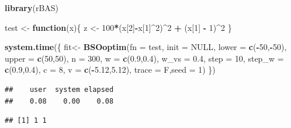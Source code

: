 \documentclass[]{ctexbook}
\newenvironment{Shaded}{\begin{snugshade}}{\end{snugshade}}
\newcommand{\KeywordTok}[1]{\textcolor[rgb]{0.13,0.29,0.53}{\textbf{#1}}}
\newcommand{\DataTypeTok}[1]{\textcolor[rgb]{0.13,0.29,0.53}{#1}}
\newcommand{\DecValTok}[1]{\textcolor[rgb]{0.00,0.00,0.81}{#1}}
\newcommand{\FloatTok}[1]{\textcolor[rgb]{0.00,0.00,0.81}{#1}}
\newcommand{\StringTok}[1]{\textcolor[rgb]{0.31,0.60,0.02}{#1}}
\newcommand{\OtherTok}[1]{\textcolor[rgb]{0.56,0.35,0.01}{#1}}
\newcommand{\ControlFlowTok}[1]{\textcolor[rgb]{0.13,0.29,0.53}{\textbf{#1}}}
\newcommand{\OperatorTok}[1]{\textcolor[rgb]{0.81,0.36,0.00}{\textbf{#1}}}
\newcommand{\NormalTok}[1]{#1}
\theoremstyle{definition}
\theoremstyle{definition}
\theoremstyle{definition}
\theoremstyle{remark}
\begin{document}
\begin{Shaded}
\begin{Highlighting}[]
\KeywordTok{library}\NormalTok{(rBAS)}

\NormalTok{test <-}\StringTok{ }\ControlFlowTok{function}\NormalTok{(x)\{}
\NormalTok{  z <-}\StringTok{ }\DecValTok{100}\OperatorTok{*}\NormalTok{(x[}\DecValTok{2}\NormalTok{]}\OperatorTok{-}\NormalTok{x[}\DecValTok{1}\NormalTok{]}\OperatorTok{^}\DecValTok{2}\NormalTok{)}\OperatorTok{^}\DecValTok{2} \OperatorTok{+}\StringTok{ }\NormalTok{(x[}\DecValTok{1}\NormalTok{] }\OperatorTok{-}\StringTok{ }\DecValTok{1}\NormalTok{)}\OperatorTok{^}\DecValTok{2}
\NormalTok{\}}

\KeywordTok{system.time}\NormalTok{(\{}
\NormalTok{  fit<-}
\StringTok{    }\KeywordTok{BSOoptim}\NormalTok{(}\DataTypeTok{fn =}\NormalTok{ test,}
             \DataTypeTok{init =} \OtherTok{NULL}\NormalTok{,}
             \DataTypeTok{lower =} \KeywordTok{c}\NormalTok{(}\OperatorTok{-}\DecValTok{50}\NormalTok{,}\OperatorTok{-}\DecValTok{50}\NormalTok{),}
             \DataTypeTok{upper =} \KeywordTok{c}\NormalTok{(}\DecValTok{50}\NormalTok{,}\DecValTok{50}\NormalTok{),}
             \DataTypeTok{n =} \DecValTok{300}\NormalTok{,}
             \DataTypeTok{w =} \KeywordTok{c}\NormalTok{(}\FloatTok{0.9}\NormalTok{,}\FloatTok{0.4}\NormalTok{),}
             \DataTypeTok{w_vs =} \FloatTok{0.4}\NormalTok{, }
             \DataTypeTok{step =} \DecValTok{10}\NormalTok{,}
             \DataTypeTok{step_w =} \KeywordTok{c}\NormalTok{(}\FloatTok{0.9}\NormalTok{,}\FloatTok{0.4}\NormalTok{),}
             \DataTypeTok{c =} \DecValTok{8}\NormalTok{,}
             \DataTypeTok{v =} \KeywordTok{c}\NormalTok{(}\OperatorTok{-}\FloatTok{5.12}\NormalTok{,}\FloatTok{5.12}\NormalTok{),}
             \DataTypeTok{trace =}\NormalTok{ F,}\DataTypeTok{seed =} \DecValTok{1}\NormalTok{)}
\NormalTok{\})}
\end{Highlighting}
\end{Shaded}

\begin{verbatim}
##    user  system elapsed 
##    0.08    0.00    0.08
\end{verbatim}

\begin{Shaded}
\end{Shaded}

\begin{verbatim}
## [1] 1 1
\end{verbatim}
\end{document}
